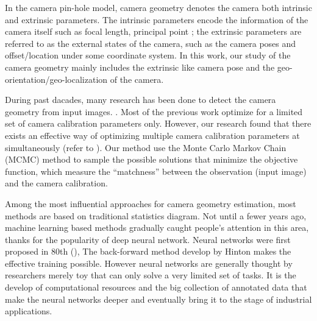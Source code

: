 In the camera pin-hole model, camera geometry denotes the camera
both intrinsic and extrinsic parameters. The intrinsic parameters
encode the information of the camera itself such as focal length,
principal point \etc; the extrinsic parameters are referred to as the
external states of the camera, such as the camera poses and
offset/location under some coordinate system. In this work, our study
of the camera geometry mainly includes the extrinsic like camera pose
and the geo-orientation/geo-localization of the camera.

During past dacades, many research has been done to detect the camera
geometry from input images. . Most of the
previous work optimize for a limited set of camera calibration
parameters only. However, our research found that there exists an
effective way of optimizing multiple camera calibration parameters at
simultaneously (refer to ). Our method use the Monte
Carlo Markov Chain (MCMC) method to sample the possible solutions that
minimize the objective function, which measure the ``matchness''
between the observation (input image) and the camera calibration.

Among the most influential approaches for camera geometry estimation,
most methods are based on traditional statistics diagram. Not until a
fewer years ago, machine learning based methods gradually caught
people's attention in this area, thanks for the popularity of deep
neural network. Neural networks were first proposed in 80th
(), The back-forward method develop by Hinton
 makes the effective training possible. However neural
networks are generally thought by researchers merely toy that can only
solve a very limited set of tasks. It is the develop of computational
resources and the big collection of annotated data that make the
neural networks deeper and eventually bring it to the stage of
industrial applications.

